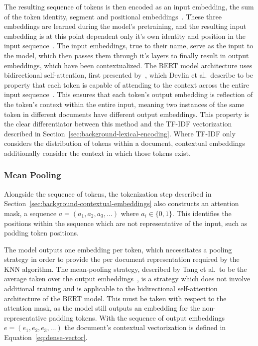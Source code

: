 \documentclass[11pt]{article}
\theoremstyle{plain}
\theoremstyle{definition}
\begin{document}
The resulting sequence of tokens is then encoded as an input embedding, the sum of the token identity, segment and positional embeddings~\cite{devlin/2018/bert}. These three embeddings are learned during the model's pretraining, and the resulting input embedding is at this point dependent only it's own identity and position in the input sequence~\cite{kubek/2025/selfimproving, huang/2021/multiplicative}. The input embeddings, true to their name, serve as the input to the model, which then passes them through it's layers to finally result in output embeddings, which have been contextualized. The BERT model architecture uses bidirectional self-attention, first presented by~\cite{vaswani/2017/attention}, which Devlin et al.\ describe to be property that each token is capable of attending to the context across the entire input sequence~\cite{devlin/2018/bert}. This ensures that each token's output embedding is reflection of the token's context within the entire input, meaning two instances of the same token in different documents have different output embeddings. This property is the clear differentiator between this method and the TF-IDF vectorization described in Section~\ref{sec:background-lexical-encoding}. Where TF-IDF only considers the distribution of tokens within a document, contextual embeddings additionally consider the context in which those tokens exist.

\subsubsection{Mean Pooling}\label{sec:background-contextual-pooling}

Alongside the sequence of tokens, the tokenization step described in Section~\ref{sec:background-contextual-embeddings} also constructs an attention mask, a sequence $a=(a_1, a_2,a_3,\dots)$ where $a_i \in \{0,1\}$. This identifies the positions within the sequence which are not representative of the input, such as padding token positions.

The model outputs one embedding per token, which necessitates a pooling strategy in order to provide the per document representation required by the KNN algorithm. The mean-pooling strategy, described by Tang et al.\ to be the average taken over the output embeddings~\cite{tang/2024/pooling}, is a strategy which does not involve additional training and is applicable to the bidirectional self-attention architecture of the BERT model. This must be taken with respect to the attention mask, as the model still outputs an embedding for the non-representative padding tokens. With the sequence of output embeddings $e=(e_1, e_2, e_3, \dots)$ the document's contextual vectorization is defined in Equation~\ref{eq:dense-vector}.
\end{document}
